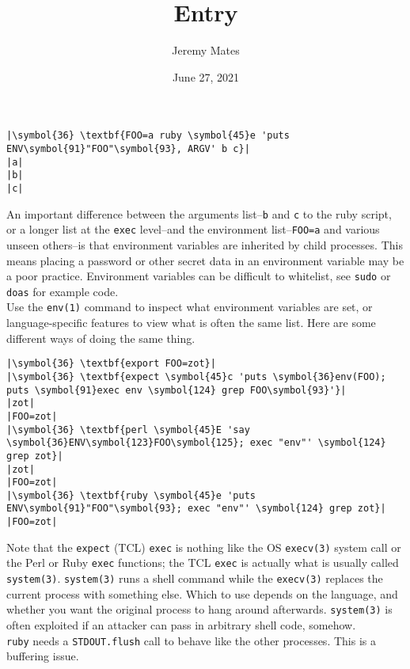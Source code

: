 \documentclass[10pt,a4paper]{article}
\title{Entry}
\author{Jeremy Mates}
\date{June 27, 2021}
\begin{document}
\renewcommand{\thefootnote}{\alph{footnote}}

\maketitle

\begin{lstlisting}
|\symbol{36} \textbf{FOO=a ruby \symbol{45}e 'puts ENV\symbol{91}"FOO"\symbol{93}, ARGV' b c}|
|a|
|b|
|c|
\end{lstlisting}

An important difference between the arguments list--\texttt{b} and
\texttt{c} to the ruby script, or a longer list at the \texttt{exec}
level--and the environment list--\texttt{FOO=a} and various unseen
others--is that environment variables are inherited by child processes.
This means placing a password or other secret data in an environment
variable may be a poor practice. Environment variables can be difficult
to whitelist, see \texttt{sudo} or \texttt{doas} for example code. \\

Use the \texttt{env(1)} command to inspect what environment variables
are set, or language-specific features to view what is often the same
list. Here are some different ways of doing the same thing.

\begin{lstlisting}
|\symbol{36} \textbf{export FOO=zot}|
|\symbol{36} \textbf{expect \symbol{45}c 'puts \symbol{36}env(FOO); puts \symbol{91}exec env \symbol{124} grep FOO\symbol{93}'}|
|zot|
|FOO=zot|
|\symbol{36} \textbf{perl \symbol{45}E 'say \symbol{36}ENV\symbol{123}FOO\symbol{125}; exec "env"' \symbol{124} grep zot}|
|zot|
|FOO=zot|
|\symbol{36} \textbf{ruby \symbol{45}e 'puts ENV\symbol{91}"FOO"\symbol{93}; exec "env"' \symbol{124} grep zot}|
|FOO=zot|
\end{lstlisting}

Note that the \texttt{expect} (TCL) \texttt{exec} is nothing like the OS
\texttt{execv(3)} system call or the Perl or Ruby \texttt{exec}
functions; the TCL \texttt{exec} is actually what is usually called
\texttt{system(3)}. \texttt{system(3)} runs a shell command while the
\texttt{execv(3)} replaces the current process with something else.
Which to use depends on the language, and whether you want the original
process to hang around afterwards. \texttt{system(3)} is often exploited
if an attacker can pass in arbitrary shell code, somehow. \\

\texttt{ruby} needs a \texttt{STDOUT.flush} call to behave like the
other processes. This is a buffering issue.
\end{document}
